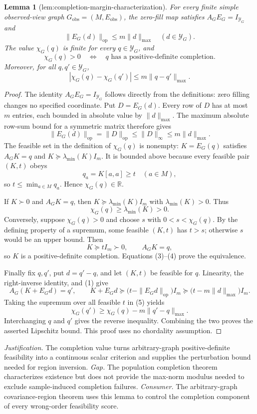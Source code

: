 \documentclass{article}
\newtheorem{lemma}{Lemma}
\begin{document}
\begin{lemma}[lem:completion-margin-characterization]\label{lem:completion-margin-characterization}
For every finite simple observed-view graph \(G_{\mathrm{obs}}=(M,E_{\mathrm{obs}})\), the zero-fill map satisfies \(A_GE_G=I_{\mathcal Y_G}\) and
\[
\|E_G(d)\|_{\mathrm{op}}\le m\|d\|_{\max}
\quad(d\in\mathcal Y_G).
\]
The value \(\chi_G(q)\) is finite for every \(q\in\mathcal Y_G\), and
\[
\chi_G(q)>0
\quad\Longleftrightarrow\quad
q\text{ has a positive-definite completion}.
\]
Moreover, for all \(q,q'\in\mathcal Y_G\),
\[
|\chi_G(q)-\chi_G(q')|\le m\|q-q'\|_{\max}.
\]
\end{lemma}
\begin{proof}
The identity \(A_GE_G=I_{\mathcal Y_G}\) follows directly from the definitions: zero filling changes no specified coordinate.  Put \(D=E_G(d)\).  Every row of \(D\) has at most \(m\) entries, each bounded in absolute value by \(\|d\|_{\max}\).  The maximum absolute row-sum bound for a symmetric matrix therefore gives
\[
\|E_G(d)\|_{\mathrm{op}}=\|D\|_{\mathrm{op}}
\le\|D\|_{\infty}
\le m\|d\|_{\max}.
\tag{1}
\]
The feasible set in the definition of \(\chi_G(q)\) is nonempty: \(K=E_G(q)\) satisfies \(A_GK=q\) and \(K\succeq\lambda_{\min}(K)I_m\).  It is bounded above because every feasible pair \((K,t)\) obeys
\[
q_a=K[a,a]\ge t
\quad(a\in M),
\tag{2}
\]
so \(t\le\min_{a\in M}q_a\).  Hence \(\chi_G(q)\in\mathbb R\).

If \(K\succ0\) and \(A_GK=q\), then \(K\succeq\lambda_{\min}(K)I_m\) with \(\lambda_{\min}(K)>0\).  Thus
\[
\chi_G(q)\ge\lambda_{\min}(K)>0.
\tag{3}
\]
Conversely, suppose \(\chi_G(q)>0\) and choose \(s\) with \(0<s<\chi_G(q)\).  By the defining property of a supremum, some feasible \((K,t)\) has \(t>s\); otherwise \(s\) would be an upper bound.  Then
\[
K\succeq tI_m\succ0,
\qquad A_GK=q,
\tag{4}
\]
so \(K\) is a positive-definite completion.  Equations (3)--(4) prove the equivalence.

Finally fix \(q,q'\), put \(d=q'-q\), and let \((K,t)\) be feasible for \(q\).  Linearity, the right-inverse identity, and (1) give
\[
A_G(K+E_Gd)=q',
\qquad
K+E_Gd\succeq
\bigl(t-\|E_Gd\|_{\mathrm{op}}\bigr)I_m
\succeq
\bigl(t-m\|d\|_{\max}\bigr)I_m.
\tag{5}
\]
Taking the supremum over all feasible \(t\) in (5) yields
\[
\chi_G(q')\ge\chi_G(q)-m\|q'-q\|_{\max}.
\tag{6}
\]
Interchanging \(q\) and \(q'\) gives the reverse inequality.  Combining the two proves the asserted Lipschitz bound.  This proof uses no chordality assumption.
\end{proof}
\par\smallskip\noindent \textit{Justification.} The completion value turns arbitrary-graph positive-definite feasibility into a continuous scalar criterion and supplies the perturbation bound needed for region inversion. \textit{Gap.} The population completion theorem characterizes existence but does not provide the max-norm modulus needed to exclude sample-induced completion failures. \textit{Consumer.} The arbitrary-graph covariance-region theorem uses this lemma to control the completion component of every wrong-order feasibility score.
\end{document}
